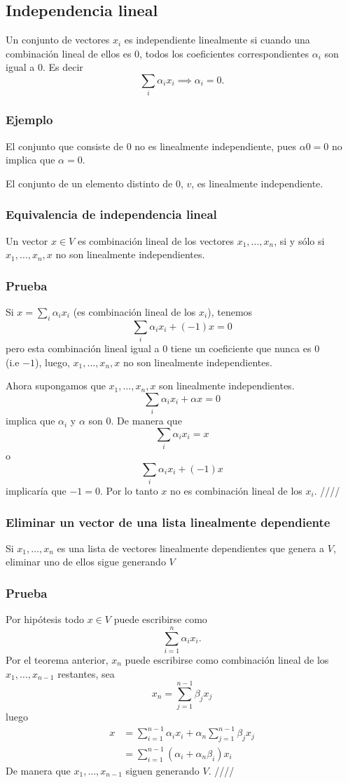 \documentclass{article}
\begin{document}
\subsection{Independencia lineal}
Un conjunto de vectores $x_i$ es independiente linealmente si
cuando una combinación lineal de ellos es $0$, todos los coeficientes
correspondientes $\alpha_i$ son igual a $0$. Es decir
$$\sum_i \alpha_i x_i \implies \alpha_i = 0.$$

\subsubsection*{Ejemplo}
El conjunto que consiste de $0$ no es linealmente independiente, pues
$\alpha 0 = 0$ no implica que $\alpha = 0$.

El conjunto de un elemento distinto de $0$, $v$, es linealmente independiente.

\newpage
\subsubsection{Equivalencia de independencia lineal}\label{dependencia}
Un vector $x\in V$ es combinación lineal de los vectores
$x_1,\ldots,x_n$, si y sólo si $x_1,\ldots,x_n,x$ no son linealmente
independientes.
\subsubsection*{Prueba}
Si $x=\sum_i \alpha_i x_i$ (es combinación lineal de los $x_i$), tenemos
$$\sum_i \alpha_i x_i +(-1)x = 0$$
pero esta combinación lineal igual a $0$ tiene un coeficiente que
nunca es $0$\\
(i.e $-1$), luego, $x_1,\ldots,x_n,x$ no son linealmente
independientes.

Ahora supongamos que $x_1,\ldots,x_n,x$ son linealmente independientes.
$$\sum_i \alpha_i x_i + \alpha x = 0$$
implica que $\alpha_i$ y $\alpha$ son $0$. De manera que
$$\sum_i \alpha_i x_i = x$$
o
$$\sum_i \alpha_i x_i + (-1)x$$
implicaría que $-1=0$. Por lo tanto $x$ no es combinación lineal
de los $x_i$. \hfill ////

\subsubsection{Eliminar un vector de una lista linealmente dependiente}
\label{eliminación}
Si $x_1,\ldots,x_n$ es una lista de vectores linealmente dependientes que genera
a $V$, eliminar uno de ellos sigue generando $V$
\subsubsection*{Prueba}
Por hipótesis todo $x\in V$ puede escribirse como
$$\sum^n_{i=1} \alpha_i x_i.$$
Por el teorema anterior, $x_n$ puede escribirse como
combinación lineal de los $x_1,\ldots,x_{n-1}$ restantes,
sea
$$x_n=\sum^{n-1}_{j=1}\beta_j x_j$$
luego
\begin{align*}
    x&=\sum^{n-1}_{i=1} \alpha_i x_i +
    \alpha_n\sum^{n-1}_{j=1}\beta_j x_j\\
    &=\sum^{n-1}_{i=1}(\alpha_i+\alpha_n\beta_i)x_i
\end{align*}
De manera que $x_1,\ldots,x_{n-1}$ siguen generando $V$.
\hfill ////
\end{document}
